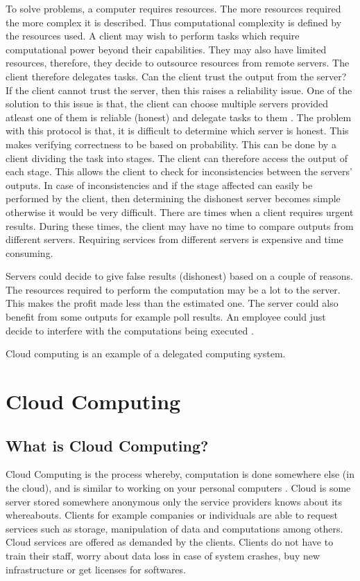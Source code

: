 To solve problems, a computer requires resources. The more resources required the more complex it is described. Thus computational complexity is defined by the resources used. A client may wish to perform tasks which require computational power beyond their capabilities. They may also have limited resources, therefore, they decide to outsource resources from remote servers. The client therefore delegates tasks. Can the client trust the output from the server? If the client cannot trust the server, then this raises a reliability issue. One of the solution to this issue is that, the client can choose multiple servers provided atleast one of them is reliable (honest) and delegate tasks to them \citep{canetti2011practical}. The problem with this protocol is that, it is difficult to determine which server is honest. This makes verifying correctness to be based on probability. This can be done by a client dividing the task into stages. The client can therefore access the output of each stage. This allows the client to check for inconsistencies between the servers' outputs. In case of inconsistencies and if the stage affected can easily be performed by the client, then determining the dishonest server becomes simple otherwise it would be very difficult. There are times when a client requires urgent results. During these times, the client may have no time to compare outputs from different servers. Requiring services from different servers is expensive and time consuming.

Servers could decide to give false results (dishonest) based on a couple of reasons. The resources required to perform the computation may be a lot to the server. This makes the profit made less than the estimated one. The server could also benefit from some outputs for example poll results. An employee could just decide to interfere with the computations being executed \citep{canetti2011practical}. 


Cloud computing is an example of a delegated computing system.


\section{Cloud Computing}
\subsection{What is Cloud Computing?}
Cloud Computing is the process whereby, computation is done somewhere else (in the cloud), and is similar to working on your personal computers \citep{hayes2008cloud}. Cloud is some server stored somewhere anonymous only the service providers knows about its whereabouts. Clients for example companies or individuals are able to request services such as storage, manipulation of data and computations among others. Cloud services are offered as demanded by the clients. Clients do not have to train their staff, worry about data loss in case of system crashes, buy new infrastructure or get licenses for softwares.

